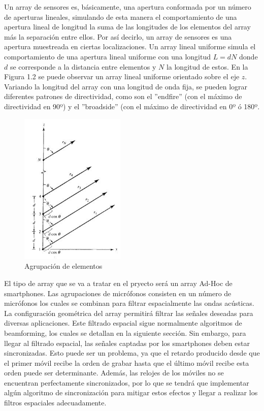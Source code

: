 \documentclass[a4paper,11pt]{book}
\begin{document}
	 Un array de sensores es, básicamente, una apertura conformada por un número de aperturas lineales, simulando de esta manera el comportamiento de una apertura lineal de longitud la suma de las longitudes de los elementos del array más la separación entre ellos. Por así decirlo, un array de sensores es una apertura muestreada en ciertas localizaciones. Un array lineal uniforme simula el comportamiento de una apertura lineal uniforme con una longitud $L = dN$ donde $d$ se corresponde a la distancia entre elementos y $N$ la longitud de estos. En la Figura 1.2 se puede observar un array lineal uniforme orientado sobre el eje $z$. Variando la longitud del array con una longitud de onda fija, se pueden lograr diferentes patrones de directividad, como son el ''endfire'' (con el máximo de directividad en 90º) y el ''broadside'' (con el máximo de directividad en 0º ó 180º.
	 \begin{figure}[hbtp]
	 \centering
	 \includegraphics[width = 5cm]{FIGURAS/array_elementos.JPG}
	 \caption{Agrupación de elementos}
	 \end{figure}
	 
	 El tipo de array que se va a tratar en el pryecto será un array Ad-Hoc de smartphones. Las agrupaciones de micrófonos consisten en un número de micrófonos los cuales se combinan para filtrar espacialmente las ondas acústicas. La configuración geométrica del array permitirá filtrar las señales deseadas para diversas aplicaciones. Este filtrado espacial sigue normalmente algoritmos de beamforming, los cuales se detallan en la siguiente sección. Sin embargo, para llegar al filtrado espacial, las señales captadas por los smartphones deben estar sincronizadas. Esto puede ser un problema, ya que el retardo producido desde que el primer móvil recibe la orden de grabar hasta que el último móvil recibe esta orden puede ser determinante. Además, las relojes de los móviles no se encuentran perfectamente sincronizados, por lo que se tendrá que implementar algún algoritmo de sincronización para mitigar estos efectos y llegar a realizar los filtros espaciales adecuadamente.
	 
\end{document}
